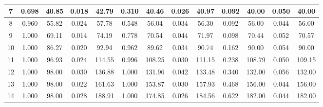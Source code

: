 \documentclass[12pt]{article}
\numberwithin{equation}{section}
\numberwithin{table}{section}
\numberwithin{thm}{section}
\numberwithin{defn}{section}
\numberwithin{lem}{section}
\numberwithin{prop}{section}
\numberwithin{cor}{section}
\numberwithin{rem}{section}
\begin{document}
\begin{appendix}
\begin{sidewaystable}[htbp]
\begin{tabular}{|c|cccc|cccc|cccc|}
7 & \multicolumn{1}{c|}{0.698} & \multicolumn{1}{c|}{40.85} & \multicolumn{1}{c|}{0.018} & 42.79 & \multicolumn{1}{c|}{0.310} & \multicolumn{1}{c|}{40.46} & \multicolumn{1}{c|}{0.026} & 40.97 & \multicolumn{1}{c|}{0.092} & \multicolumn{1}{c|}{40.00} & \multicolumn{1}{c|}{0.050} & 40.00 \\ \hline
8 & \multicolumn{1}{c|}{0.960} & \multicolumn{1}{c|}{55.82} & \multicolumn{1}{c|}{0.024} & 57.78 & \multicolumn{1}{c|}{0.548} & \multicolumn{1}{c|}{56.04} & \multicolumn{1}{c|}{0.034} & 56.30 & \multicolumn{1}{c|}{0.092} & \multicolumn{1}{c|}{56.00} & \multicolumn{1}{c|}{0.044} & 56.00 \\ \hline
9 & \multicolumn{1}{c|}{1.000} & \multicolumn{1}{c|}{69.11} & \multicolumn{1}{c|}{0.014} & 74.19 & \multicolumn{1}{c|}{0.778} & \multicolumn{1}{c|}{70.54} & \multicolumn{1}{c|}{0.044} & 71.97 & \multicolumn{1}{c|}{0.098} & \multicolumn{1}{c|}{70.44} & \multicolumn{1}{c|}{0.052} & 70.57 \\ \hline
10 & \multicolumn{1}{c|}{1.000} & \multicolumn{1}{c|}{86.27} & \multicolumn{1}{c|}{0.020} & 92.94 & \multicolumn{1}{c|}{0.962} & \multicolumn{1}{c|}{89.62} & \multicolumn{1}{c|}{0.034} & 90.74 & \multicolumn{1}{c|}{0.162} & \multicolumn{1}{c|}{90.00} & \multicolumn{1}{c|}{0.054} & 90.00 \\ \hline
11 & \multicolumn{1}{c|}{1.000} & \multicolumn{1}{c|}{96.93} & \multicolumn{1}{c|}{0.024} & 114.55 & \multicolumn{1}{c|}{0.996} & \multicolumn{1}{c|}{108.25} & \multicolumn{1}{c|}{0.030} & 111.15 & \multicolumn{1}{c|}{0.238} & \multicolumn{1}{c|}{108.79} & \multicolumn{1}{c|}{0.050} & 109.15 \\ \hline
12 & \multicolumn{1}{c|}{1.000} & \multicolumn{1}{c|}{98.00} & \multicolumn{1}{c|}{0.030} & 136.88 & \multicolumn{1}{c|}{1.000} & \multicolumn{1}{c|}{131.96} & \multicolumn{1}{c|}{0.042} & 133.48 & \multicolumn{1}{c|}{0.340} & \multicolumn{1}{c|}{132.00} & \multicolumn{1}{c|}{0.056} & 132.00 \\ \hline
13 & \multicolumn{1}{c|}{1.000} & \multicolumn{1}{c|}{98.00} & \multicolumn{1}{c|}{0.022} & 161.63 & \multicolumn{1}{c|}{1.000} & \multicolumn{1}{c|}{153.87} & \multicolumn{1}{c|}{0.030} & 157.93 & \multicolumn{1}{c|}{0.468} & \multicolumn{1}{c|}{156.00} & \multicolumn{1}{c|}{0.044} & 156.00 \\ \hline
14 & \multicolumn{1}{c|}{1.000} & \multicolumn{1}{c|}{98.00} & \multicolumn{1}{c|}{0.028} & 188.91 & \multicolumn{1}{c|}{1.000} & \multicolumn{1}{c|}{174.85} & \multicolumn{1}{c|}{0.026} & 184.56 & \multicolumn{1}{c|}{0.622} & \multicolumn{1}{c|}{182.00} & \multicolumn{1}{c|}{0.044} & 182.00 \\ \hline

\end{tabular}
\end{sidewaystable}
\end{appendix}
\end{document}
